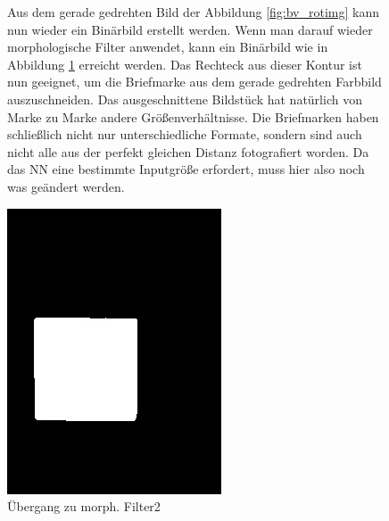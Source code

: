 \documentclass[12pt,toc=bib,toc=listof]{scrreprt}
\begin{document}
\begin{figure}[h]
\begin{minipage}[t]{.75\linewidth}

Aus dem gerade gedrehten Bild der Abbildung \ref{fig:bv_rotimg} kann nun wieder ein Binärbild erstellt werden. Wenn man darauf wieder morphologische Filter anwendet, kann ein Binärbild wie in Abbildung \ref{fig:bv_morph2} erreicht werden. Das Rechteck aus dieser Kontur ist nun geeignet, um die Briefmarke aus dem gerade gedrehten Farbbild auszuschneiden. Das ausgeschnittene Bildstück hat natürlich von Marke zu Marke andere Größenverhältnisse. Die Briefmarken haben schließlich nicht nur unterschiedliche Formate, sondern sind auch nicht alle aus der perfekt gleichen Distanz fotografiert worden. Da das NN eine bestimmte Inputgröße erfordert, muss hier also noch was geändert werden.
\end{minipage}
\hfill
\begin{minipage}[t]{.2\linewidth}
\strut\vspace*{-\baselineskip}
\newline
  \includegraphics[width=\linewidth]{./bilder/bin2morph}
  \caption{Übergang zu morph. Filter2}
  \label{fig:bv_morph2}
\end{minipage}
\end{figure}
\end{document}
